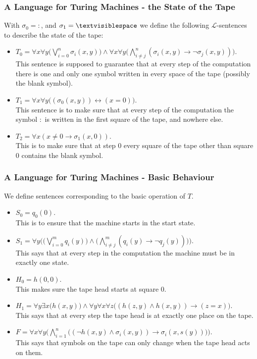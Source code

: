 \documentclass[handout]{beamer}
\newcommand{\tvs}{\textvisiblespace}
\newcommand{\ra}{\rightarrow}
\begin{document}
\begin{frame}
\frametitle{A Language for Turing Machines - the State of the Tape} 
With $\sigma_0= :$, and $\sigma_1=\tvs$ we define the following $\mathscr{L}$-sentences to describe the state of the tape: \vspace{0.2cm}
\begin{itemize}
\item \small $T_0=\forall x \forall y\big(\bigvee_{i=0}^n \sigma_i(x,y)\big)\wedge \forall x \forall y\big(\bigwedge_{i\neq j}^n (\sigma_i(x,y)\ra\neg \sigma_j(x,y))\big)$.\\
\normalsize This sentence is supposed to guarantee that at every step of the computation there is one and only one symbol written in every space of the tape (possibly the blank symbol).
\vspace{0.2cm}
\item $T_1 = \forall x\forall y\big((\sigma_0(x,y))\leftrightarrow (x=0)\big) $.\\
This sentence is to make sure that at every step of the computation the symbol $:$ is written in the first square of the tape, and nowhere else.
\vspace{0.2cm}
\item $T_2 = \forall x (x\neq 0 \ra\sigma_1(x,0))$.\\
This is to make sure that at step 0 every square of the tape other than square 0 contains the blank symbol.
\end{itemize}
\end{frame}

\begin{frame}
\frametitle{A Language for Turing Machines - Basic Behaviour} 
We define sentences corresponding to the basic operation of $T$.
\begin{itemize}
\item $S_0=q_0(0)$.\\
This is to ensure that the machine starts in the start state. 
\item $S_1=\forall y \Big(\big(\bigvee_{i=0}^m q_i(y)\big)\wedge \big(\bigwedge_{i\neq j}^m (q_i(y)\ra \neg q_j(y))\big)\Big)$.\\
This says that at every step in the computation the machine must be in exactly one state.
\item $H_0 = h(0,0)$.\\
This makes sure the tape head starts at square 0.
\item $H_1 = \forall y\exists x \big(h(x,y)\big) \wedge \forall y \forall x \forall z\big((h(z,y) \wedge h(x,y))\ra (z=x)\big)$.\\
This says that at every step the tape head is at exactly one place on the tape.
\item $F=\forall x\forall y\Big(\bigwedge _{i=1}^n \big((\neg h(x,y)\wedge \sigma_i(x,y))\ra \sigma_i(x,s(y))\big)\Big)$.\\
This says that symbols on the tape can only change when the tape head acts on them.
\end{itemize}
\end{frame}
\end{document}
